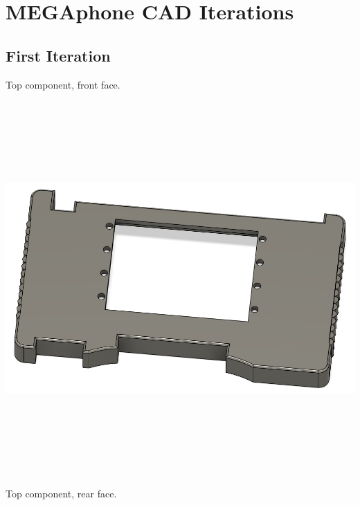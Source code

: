 
\chapter{MEGAphone CAD Iterations} %

\label{AppendixC} %

\clearpage

\section{First Iteration}
Top component, front face. \newline
\includegraphics[width=15cm,height=15cm,keepaspectratio]{Figures/iteration1_top_front.png} \newline
Top component, rear face. \newline
